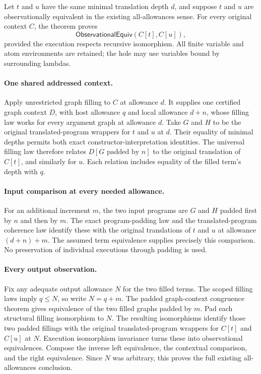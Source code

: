 
Let $t$ and $u$ have the same minimal translation depth $d$, and suppose
$t$ and $u$ are observationally equivalent in the existing all-allowances
sense. For every original context $C$, the theorem proves
\[
 \mathsf{ObservationalEquiv}(C[t],C[u]),
\]
provided the execution respects recursive isomorphism. All finite variable
and atom environments are retained; the hole may use variables bound by
surrounding lambdas.

\paragraph{One shared addressed context.}
Apply unrestricted graph filling to $C$ at allowance $d$. It supplies one
certified graph context $D$, with host allowance $q$ and local allowance
$d+n$, whose filling law works for every argument graph at allowance $d$.
Take $G$ and $H$ to be the original translated-program wrappers for $t$ and
$u$ at $d$. Their equality of minimal depths permits both exact
constructor-interpretation identities. The universal filling law therefore
relates $D[G\text{ padded by }n]$ to the original translation of $C[t]$, and
similarly for $u$. Each relation includes equality of the filled term's depth
with $q$.

\paragraph{Input comparison at every needed allowance.}
For an additional increment $m$, the two input programs are $G$ and $H$
padded first by $n$ and then by $m$. The exact program-padding law and the
translated-program coherence law identify these with the original translations
of $t$ and $u$ at allowance $(d+n)+m$. The assumed term equivalence supplies
precisely this comparison. No preservation of individual executions through
padding is used.

\paragraph{Every output observation.}
Fix any adequate output allowance $N$ for the two filled terms. The scoped
filling laws imply $q\leq N$, so write $N=q+m$. The padded graph-context
congruence theorem gives equivalence of the two filled graphs padded by $m$.
Pad each structural filling isomorphism to $N$. The resulting isomorphisms
identify those two padded fillings with the original translated-program
wrappers for $C[t]$ and $C[u]$ at $N$. Execution isomorphism invariance turns
these into observational equivalences. Compose the inverse left equivalence,
the contextual comparison, and the right equivalence. Since $N$ was arbitrary,
this proves the full existing all-allowances conclusion.

